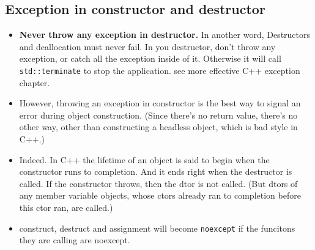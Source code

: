 \documentclass[a4paper,11pt,twoside]{book}
\begin{document}
\subsection{Exception in constructor and destructor}
\begin{itemize}
	\item \textbf{Never throw any exception in destructor.} In another word, Destructors and deallocation must never fail. In you destructor, don't throw any exception, or catch all the exception inside of it. Otherwise it will call \texttt{std::terminate} to stop the application. see more effective C++ exception chapter.
	
	\item However, throwing an exception in constructor is the best way to signal an error during object construction. (Since there's no return value, there's no other way, other than constructing a headless object, which is bad style in C++.)
	
	\item Indeed. In C++ the lifetime of an object is said to begin when the constructor runs to completion. And it ends right when the destructor is called. If the constructor throws, then the dtor is not called. (But dtors of any member variable objects, whose ctors already ran to completion before this ctor ran, are called.)
	
	\item construct, destruct and assignment will become \texttt{noexcept} if the funcitons they are calling are noexcept. 
	
\end{itemize}
\end{document}

